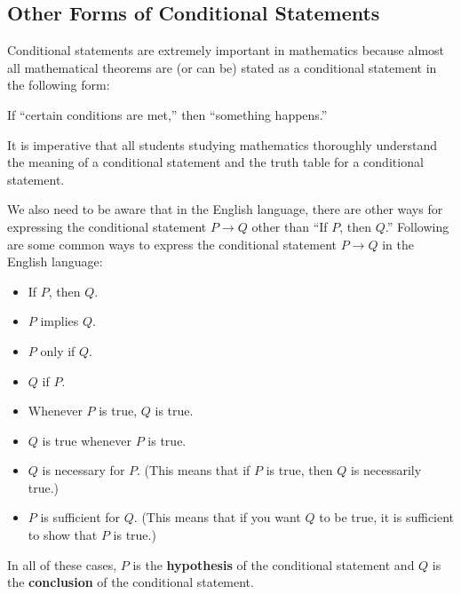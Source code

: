 \subsection*{Other Forms of Conditional Statements}
Conditional statements
%
%
 are extremely important in mathematics because almost all mathematical theorems are (or can be) stated as a conditional statement in the following form:
\begin{center}
If ``certain conditions are met,'' then ``something happens.''
\end{center}
It is imperative that all students studying mathematics thoroughly understand the meaning of a conditional statement and the truth table for a conditional statement.

We also need to be aware that in the English language, there are other ways for expressing the conditional statement $P \to Q$ other than  ``If  $P$, then  $Q$.''   
Following are some common ways to express the conditional statement  $P \to Q$ in the English language:

\begin{multicols}{2}
\begin{itemize}
  \item If  $P$, then  $Q$.
  \item $P$  implies  $Q$.
  \item $P$  only if  $Q$.
%
  \item $Q$  if  $P$.
  \item Whenever  $P$  is true,  $Q$  is true.
  \item $Q$  is true whenever  $P$  is true.
\end{itemize}
\end{multicols}

\begin{itemize}
  \item $Q$  is necessary
%
 for  $P$.  
(This means that if  $P$  is true, then  $Q$  is necessarily true.)
  \item $P$  is sufficient for  $Q$.  
(This means that if you want  $Q$  to be true, it is sufficient
%
 to show that  $P$  is true.)
\end{itemize}

In all of these cases,  $P$  is the \textbf{hypothesis}
%
 of the conditional statement and  $Q$ is the \textbf{conclusion}
%
 of the conditional statement.
\hbreak

